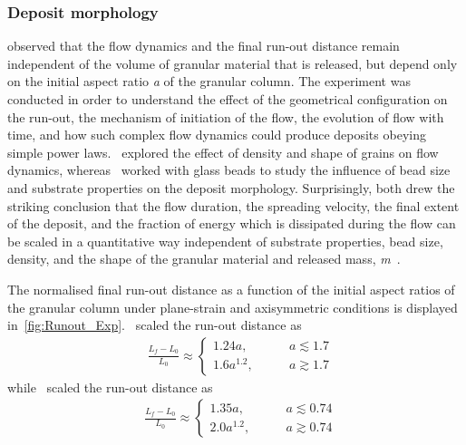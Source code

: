 \subsubsection{Deposit morphology}


\citet{Lajeunesse2005} observed that the flow dynamics and the final run-out 
distance remain independent of the volume of granular material that is 
released, but depend only on the initial aspect ratio \textit{a} of the 
granular column. The experiment was conducted in order to understand the effect 
of the 
geometrical configuration on the run-out, the mechanism of initiation of the 
flow, the evolution of flow with time, and how such complex flow 
dynamics could produce deposits obeying simple power laws.~\citet{Lube2005} 
explored the effect of density and shape of grains on flow dynamics, 
whereas~\citet{Lajeunesse2004} worked with glass beads to study the influence 
of bead size and substrate properties on the deposit morphology. Surprisingly, 
both drew the striking conclusion that the flow duration, the spreading 
velocity, the final extent of the deposit, and the fraction of energy which is 
dissipated during the flow can be scaled in a quantitative way independent of 
substrate properties, bead size, density, and the shape of the granular 
material 
and released mass, \textit{m}~\citep{Lajeunesse2005}.

The normalised final run-out distance as a function of the initial aspect 
ratios of the granular column under plane-strain and axisymmetric conditions 
is displayed in~\cref{fig:Runout_Exp}.~\citet{Lube2005} scaled the run-out 
distance 
as
\begin{align}
& \frac{\textit{L}_{\textit{f}}- 
\textit{L}_{\textit{0}}}{\textit{L}_{\textit{0}}} \approx
\begin{cases} 
1.24\textit{a}, \qquad &\textit{a} \lesssim 1.7 \\
1.6\textit{a}^{1.2}, \qquad &\textit{a} \gtrsim 1.7
\end{cases}
\end{align}
while~\citet{Lajeunesse2005} scaled the run-out distance as
\begin{align}
& \frac{\textit{L}_{\textit{f}}- 
\textit{L}_{\textit{0}}}{\textit{L}_{\textit{0}}} \approx
\begin{cases} 
1.35\textit{a}, \qquad &\textit{a} \lesssim 0.74 \\
2.0\textit{a}^{1.2}, \qquad &\textit{a} \gtrsim 0.74
\end{cases}
\end{align} 


